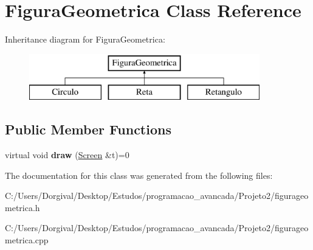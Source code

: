 \hypertarget{class_figura_geometrica}{}\section{Figura\+Geometrica Class Reference}
\label{class_figura_geometrica}
Inheritance diagram for Figura\+Geometrica\+:\begin{figure}[H]
\begin{center}
\leavevmode
\includegraphics[height=2.000000cm]{class_figura_geometrica}
\end{center}
\end{figure}
\subsection*{Public Member Functions}
\begin{DoxyCompactItemize}
\item 
\mbox{\label{class_figura_geometrica_a06404670d06d28d12f5f386901186925}} 
virtual void {\bfseries draw} (\mbox{\hyperlink{class_screen}{Screen}} \&t)=0
\end{DoxyCompactItemize}


The documentation for this class was generated from the following files\+:\begin{DoxyCompactItemize}
\item 
C\+:/\+Users/\+Dorgival/\+Desktop/\+Estudos/programacao\+\_\+avancada/\+Projeto2/figurageometrica.\+h\item 
C\+:/\+Users/\+Dorgival/\+Desktop/\+Estudos/programacao\+\_\+avancada/\+Projeto2/figurageometrica.\+cpp\end{DoxyCompactItemize}
